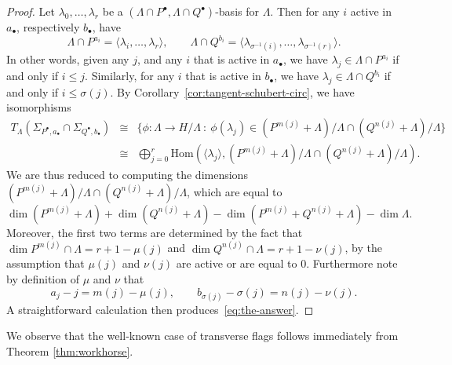 \documentclass{amsart}
\begin{document}
\begin{proof}
Let $\lambda_0,\ldots,\lambda_r$ be a 
$(\Lambda\cap P^{\bullet},\Lambda\cap Q^{\bullet})$-basis for 
$\Lambda$.   Then for any $i$ active in $a_{\bullet}$, respectively $b_{\bullet}$, have
\begin{equation}\label{eq:lambda-basis}
\Lambda \cap P^{a_i} =\langle \lambda_i,\ldots,\lambda_r\rangle,\qquad \Lambda\cap Q^{b_i} = \langle \lambda_{\sigma^{-1}(i)}, \ldots,\lambda_{\sigma^{-1}(r)}\rangle.
\end{equation}
%
In other words, given any $j$, and any $i$ that is active in $a_{\bullet}$, we have $\lambda_j\in \Lambda\cap P^{a_i}$ if and only if $i\le j$.  Similarly, for any $i$ that is active in $b_{\bullet}$, we have $\lambda_j\in \Lambda\cap Q^{b_i}$ if and only if $i\le\sigma( j)$.  
By Corollary~\ref{cor:tangent-schubert-circ}, we have isomorphisms
\begin{eqnarray*}
T_\Lambda (\Sigma_{P^{\bullet},a_{\bullet}} \cap \Sigma_{Q^{\bullet},b_{\bullet}})
 &\cong& \{\phi\colon \Lambda\to H/\Lambda ~:~ \phi(\lambda_j) \in (P^{m(j)}+\Lambda)/\Lambda \cap (Q^{n(j)}+\Lambda)/\Lambda\}\\
 &\cong&  \bigoplus_{j=0}^r \mathrm{Hom} \left(\langle \lambda_j\rangle, (P^{m(j)}+\Lambda)/\Lambda \cap (Q^{n(j)}+\Lambda)/\Lambda\right).\end{eqnarray*}
 We are thus reduced to computing the dimensions $(P^{m(j)}+\Lambda)/\Lambda \cap (Q^{n(j)}+\Lambda)/\Lambda$, which are equal to
$$\dim (P^{m(j)}+\Lambda)+ \dim (Q^{n(j)}+\Lambda)
- \dim (P^{m(j)}+ Q^{n(j)}+\Lambda)-\dim \Lambda.$$
 Moreover, the first two terms are determined by the fact that $\dim P^{m(j)}\cap \Lambda = r+1-\mu(j)$ and $\dim Q^{n(j)} \cap \Lambda = r+1-\nu(j)$, by the assumption that $\mu(j)$ and $\nu(j)$ are active or are equal to $0$. Furthermore note by definition of $\mu$ and $\nu$ that $$a_j - j = m(j) - \mu(j),\qquad b_{\sigma(j)} - \sigma(j) = n(j) - \nu(j).$$
 A straightforward calculation then produces~\eqref{eq:the-answer}.
\end{proof}

We observe that the well-known case of transverse flags follows
immediately from Theorem \ref{thm:workhorse}.
\end{document}
